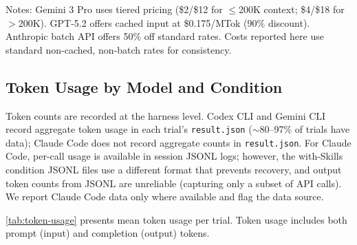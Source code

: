 \noindent Notes: Gemini 3 Pro uses tiered pricing (\$2/\$12 for $\leq$200K context; \$4/\$18 for $>$200K). GPT-5.2 offers cached input at \$0.175/MTok (90\% discount). Anthropic batch API offers 50\% off standard rates. Costs reported here use standard non-cached, non-batch rates for consistency.

\subsection{Token Usage by Model and Condition}

Token counts are recorded at the harness level. Codex CLI and Gemini CLI record aggregate token usage in each trial's \texttt{result.json} ($\sim$80--97\% of trials have data); Claude Code does not record aggregate counts in \texttt{result.json}. For Claude Code, per-call usage is available in session JSONL logs; however, the with-Skills condition JSONL files use a different format that prevents recovery, and output token counts from JSONL are unreliable (capturing only a subset of API calls). We report Claude Code data only where available and flag the data source.

\autoref{tab:token-usage} presents mean token usage per trial. Token usage includes both prompt (input) and completion (output) tokens.

